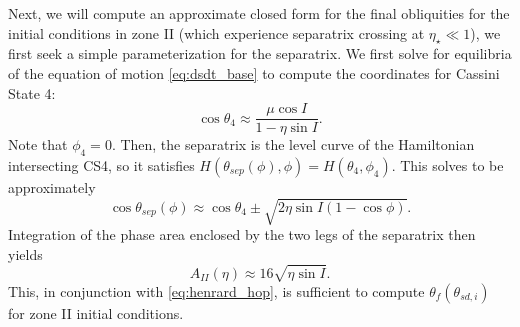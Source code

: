\documentclass[
        fleqn,
        usenatbib,
    ]{mnras}
\newcommand*{\p}[1]{\left(#1\right)}
\begin{document}
Next, we will compute an approximate closed form for the final obliquities for
the initial conditions in zone II (which experience separatrix crossing at
$\eta_\star \ll 1$), we first seek a simple parameterization for the separatrix.
We first solve for equilibria of the equation of motion \autoref{eq:dsdt_base}
to compute the coordinates for Cassini State 4:
\begin{equation}
    \cos \theta_4 \approx \frac{\mu \cos I}{1 - \eta \sin I}.
\end{equation}
Note that $\phi_4 = 0$. Then, the separatrix is the level curve of the
Hamiltonian intersecting CS4, so it satisfies $H\p{\theta_{sep}(\phi), \phi} =
H\p{\theta_4, \phi_4}$. This solves to be approximately
\begin{equation}
    \cos \theta_{sep}(\phi) \approx \cos \theta_4 \pm
        \sqrt{2\eta \sin I\p{1 - \cos \phi}}.
\end{equation}
Integration of the phase area enclosed by the two legs of the separatrix then
yields
\begin{equation}
    A_{II}(\eta) \approx 16\sqrt{\eta \sin I}.\label{eq:a_approx}
\end{equation}
This, in conjunction with \autoref{eq:henrard_hop}, is sufficient to compute
$\theta_f\p{\theta_{sd, i}}$ for zone II initial conditions.
\end{document}
